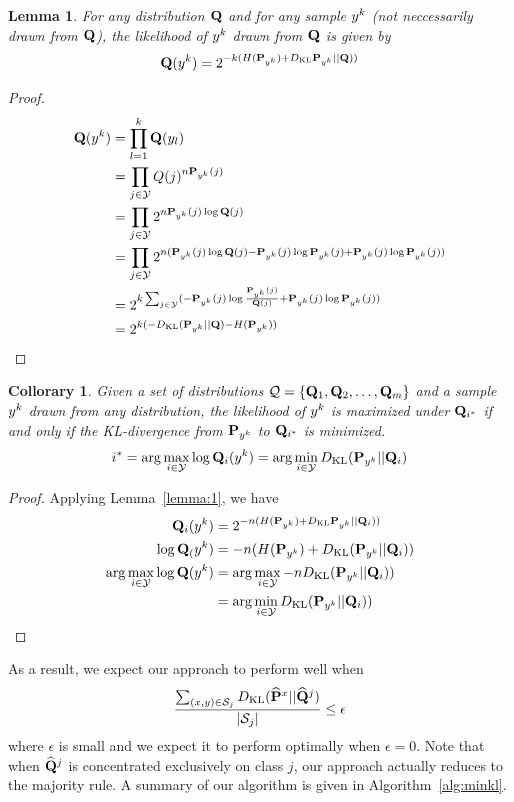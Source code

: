 \documentclass{article}
\newtheorem{lemma}[theorem]{Lemma}
\newtheorem{collorary}[theorem]{Collorary}
\begin{document}
\begin{lemma}
\label{lemma:dkl}
For any distribution $\mathbf{Q}$ and for any sample $y^k$ (not neccessarily
drawn from $\mathbf{Q}$), the likelihood of $y^k$ drawn from $\mathbf{Q}$ is given by
\[
\mathbf{Q}(y^k) = 2^{-k(H(\mathbf{P}_{y^k}) + D_{\mathrm{KL}}\mathbf{P}_{y^k} || \mathbf{Q}))}
\]
\end{lemma}
\begin{proof}
  \begin{align*}
    \mathbf{Q}(y^k) 
&= \prod_{l=1}^k \mathbf{Q}(y_l)\\ 
&= \prod_{j \in \mathcal{Y}} Q(j)^{n\mathbf{P}_{y^k}(j)}\\ 
&= \prod_{j \in \mathcal{Y}} 2^{n\mathbf{P}_{y^k}(j) \log \mathbf{Q}(j)}\\ 
&= \prod_{j \in \mathcal{Y}} 2^{n(\mathbf{P}_{y^k}(j) \log \mathbf{Q}(j) - \mathbf{P}_{y^k}(j) \log \mathbf{P}_{y^k}(j) + \mathbf{P}_{y^k}(j) \log \mathbf{P}_{y^k}(j))}\\ 
&= 2^{k \sum_{j \in \mathcal{Y}} (-\mathbf{P}_{y^k}(j) \log \frac{\mathbf{P}_{y^k}(j)}{\mathbf{Q}(j)} + \mathbf{P}_{y^k}(j) \log \mathbf{P}_{y^k}(j))}\\ 
&= 2^{k(-D_{\mathrm{KL}}(\mathbf{P}_{y^k}||\mathbf{Q}) - H(\mathbf{P}_{y^k}))}\\
  \end{align*}
\end{proof}

\begin{collorary}
\label{col:min_dkl}
Given a set of distributions $\mathcal{Q} = \{\mathbf{Q}_1,\mathbf{Q}_2, \ldots,
\mathbf{Q}_{m}\}$ and a sample $y^k$ drawn from any distribution, the
likelihood of $y^k$ is maximized under $\mathbf{Q}_{i^*}$ if and only if
the KL-divergence from $\mathbf{P}_{y^k}$ to $\mathbf{Q}_{i^*}$ is minimized.
\[
 i^* = \arg\max_{i \in \mathcal{Y}} \log \mathbf{Q}_i(y^k) = \arg\min_{i \in \mathcal{Y}} D_{\mathrm{KL}}(\mathbf{P}_{y^k}||\mathbf{Q}_i)
\]
\end{collorary}
\begin{proof}
  Applying Lemma~\ref{lemma:1}, we have
  \begin{align*}
    \mathbf{Q}_i(y^k) &= 2^{-n(H(\mathbf{P}_{y^k}) + D_{\mathrm{KL}}\mathbf{P}_{y^k} || \mathbf{Q}_i))}\\
    \log \mathbf{Q}_(y^k) &= -n(H(\mathbf{P}_{y^k}) + D_{\mathrm{KL}}(\mathbf{P}_{y^k} || \mathbf{Q}_i))\\
    \arg\max_{i \in \mathcal{Y}} \log \mathbf{Q}(y^k) &= \arg\max_{i \in \mathcal{Y}} - nD_{\mathrm{KL}}(\mathbf{P}_{y^k} || \mathbf{Q}_i))\\ 
    &= \arg\min_{i \in \mathcal{Y}} D_{\mathrm{KL}}(\mathbf{P}_{y^k} || \mathbf{Q}_i))\\
  \end{align*}
\end{proof}

As a result, we expect our approach to perform well when 
\[
\frac{\sum_{(x,y) \in \mathcal{S}_j} D_{\mathrm{KL}}(\widehat{\mathbf{P}}^x || \widehat{\mathbf{Q}}^j)}{|\mathcal{S}_j|}  \le \epsilon
\]
where $\epsilon$ is small and we expect it to perform optimally when
$\epsilon = 0$. Note that when $\widehat{\mathbf{Q}}^j$ is concentrated exclusively on
class $j$, our approach actually reduces to the majority rule. A
summary of our algorithm is given in Algorithm~\ref{alg:minkl}.
\end{document}
